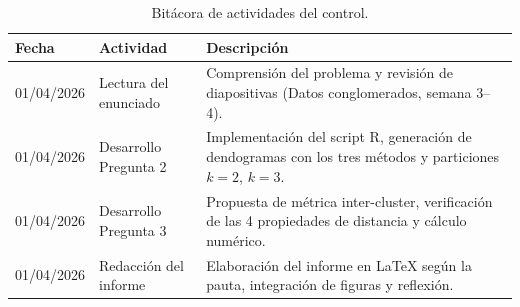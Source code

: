 \documentclass[10pt,a4paper]{article}
\begin{document}
\begin{table}[H]
\centering
\footnotesize
\begin{tabular}{p{2.5cm} p{3cm} p{8cm}}
\toprule
\textbf{Fecha} & \textbf{Actividad} & \textbf{Descripción} \\
\midrule
01/04/2026 & Lectura del enunciado & Comprensión del problema y revisión de diapositivas (Datos conglomerados, semana 3--4). \\
01/04/2026 & Desarrollo Pregunta 2 & Implementación del script R, generación de dendogramas con los tres métodos y particiones $k=2$, $k=3$. \\
01/04/2026 & Desarrollo Pregunta 3 & Propuesta de métrica inter-cluster, verificación de las 4 propiedades de distancia y cálculo numérico. \\
01/04/2026 & Redacción del informe & Elaboración del informe en \LaTeX{} según la pauta, integración de figuras y reflexión. \\
\bottomrule
\end{tabular}
\caption{Bitácora de actividades del control.}
\end{table}
\end{document}

